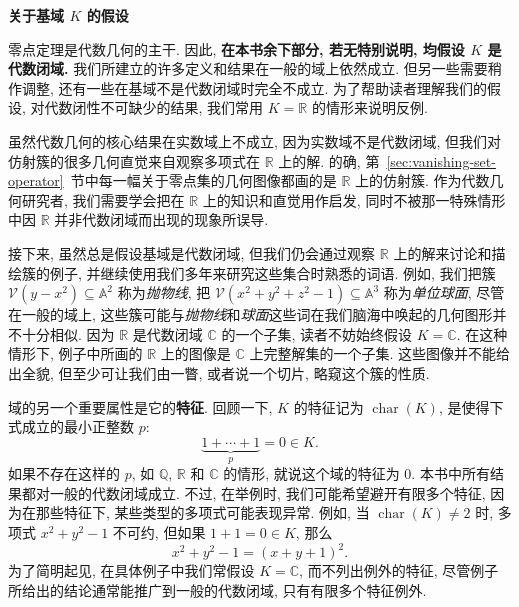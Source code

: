 \begin{BookGroundFieldNote}
  \noindent\textbf{\color{red!45!black}关于基域 $K$ 的假设}\par\smallskip
  零点定理是代数几何的主干. 因此, \textbf{在本书余下部分, 若无特别说明, 均假设 $K$ 是代数闭域.} 我们所建立的许多定义和结果在一般的域上依然成立. 但另一些需要稍作调整, 还有一些在基域不是代数闭域时完全不成立. 为了帮助读者理解我们的假设, 对代数闭性不可缺少的结果, 我们常用 $K=\mathbb{R}$ 的情形来说明反例.

  虽然代数几何的核心结果在实数域上不成立, 因为实数域不是代数闭域, 但我们对仿射簇的很多几何直觉来自观察多项式在 $\mathbb{R}$ 上的解. 的确, 第~\ref{sec:vanishing-set-operator}~节中每一幅关于零点集的几何图像都画的是 $\mathbb{R}$ 上的仿射簇. 作为代数几何研究者, 我们需要学会把在 $\mathbb{R}$ 上的知识和直觉用作启发, 同时不被那一特殊情形中因 $\mathbb{R}$ 并非代数闭域而出现的现象所误导.

  接下来, 虽然总是假设基域是代数闭域, 但我们仍会通过观察 $\mathbb{R}$ 上的解来讨论和描绘簇的例子, 并继续使用我们多年来研究这些集合时熟悉的词语. 例如, 我们把簇 $\mathcal{V}(y-x^{2})\subseteq\mathbb{A}^{2}$ 称为\emph{抛物线}, 把 $\mathcal{V}(x^{2}+y^{2}+z^{2}-1)\subseteq\mathbb{A}^{3}$ 称为\emph{单位球面}, 尽管在一般的域上, 这些簇可能与\emph{抛物线}和\emph{球面}这些词在我们脑海中唤起的几何图形并不十分相似. 因为 $\mathbb{R}$ 是代数闭域 $\mathbb{C}$ 的一个子集, 读者不妨始终假设 $K=\mathbb{C}$. 在这种情形下, 例子中所画的 $\mathbb{R}$ 上的图像是 $\mathbb{C}$ 上完整解集的一个子集. 这些图像并不能给出全貌, 但至少可让我们由一瞥, 或者说一个切片, 略窥这个簇的性质.

  域的另一个重要属性是它的\textbf{特征}. 回顾一下, $K$ 的特征记为 $\operatorname{char}(K)$, 是使得下式成立的最小正整数 $p$:
  \[
    \underbrace{1+\cdots+1}_{p}=0\in K.
  \]
  如果不存在这样的 $p$, 如 $\mathbb{Q}$, $\mathbb{R}$ 和 $\mathbb{C}$ 的情形, 就说这个域的特征为 $0$. 本书中所有结果都对一般的代数闭域成立. 不过, 在举例时, 我们可能希望避开有限多个特征, 因为在那些特征下, 某些类型的多项式可能表现异常. 例如, 当 $\operatorname{char}(K)\ne2$ 时, 多项式 $x^{2}+y^{2}-1$ 不可约, 但如果 $1+1=0\in K$, 那么
  \[
    x^{2}+y^{2}-1=(x+y+1)^{2}.
  \]
  为了简明起见, 在具体例子中我们常假设 $K=\mathbb{C}$, 而不列出例外的特征, 尽管例子所给出的结论通常能推广到一般的代数闭域, 只有有限多个特征例外.
\end{BookGroundFieldNote}

